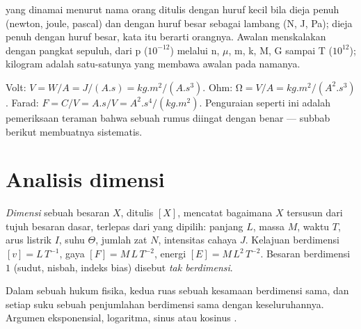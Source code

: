 \begin{remark}\label{rem:b1:units-dimensions:names}
 yang dinamai menurut nama orang ditulis dengan huruf kecil bila
dieja penuh (newton, joule, pascal) dan dengan huruf besar sebagai
lambang (\unit{N}, \unit{J}, \unit{Pa}); dieja penuh dengan huruf
besar, kata itu berarti orangnya. Awalan menskalakan dengan pangkat
sepuluh, dari p ($10^{-12}$) melalui n, $\mu$, m, k, M, G sampai T
($10^{12}$); kilogram adalah satu-satunya  yang membawa
awalan pada namanya.
\end{remark}

\begin{example}\label{ex:b1:units-dimensions:unpack}
Volt: $\unit{V} = \unit{W/A} = \unit{J/(A.s)} = \unit{kg.m^2/(A.s^3)}$.
Ohm: $\unit{\ohm} = \unit{V/A} = \unit{kg.m^2/(A^2.s^3)}$. Farad:
$\unit{F} = \unit{C/V} = \unit{A.s/V} = \unit{A^2.s^4/(kg.m^2)}$.
Penguraian seperti ini adalah pemeriksaan teraman bahwa sebuah rumus
diingat dengan benar --- subbab berikut membuatnya sistematis.
\end{example}

\section{Analisis dimensi}

\begin{definition}[Dimensi]\label{def:b1:units-dimensions:dimension}
\emph{Dimensi} sebuah besaran $X$, ditulis $[X]$, mencatat bagaimana
$X$ tersusun dari tujuh besaran dasar, terlepas dari  yang
dipilih: panjang $L$, massa $M$, waktu $T$, arus listrik $I$,
suhu $\Theta$, jumlah zat $N$, intensitas cahaya $J$.
Kelajuan berdimensi $[v] = L\,T^{-1}$, gaya
$[F] = M\,L\,T^{-2}$, energi $[E] = M\,L^2\,T^{-2}$. Besaran
berdimensi $1$ (sudut, nisbah, indeks bias) disebut
\emph{tak berdimensi}.
\end{definition}

\begin{theorem}\label{thm:b1:units-dimensions:homogeneity}
Dalam sebuah hukum fisika, kedua ruas sebuah kesamaan berdimensi sama,
dan setiap suku sebuah penjumlahan berdimensi sama dengan keseluruhannya.
Argumen eksponensial, logaritma, sinus atau kosinus .
\end{theorem}

